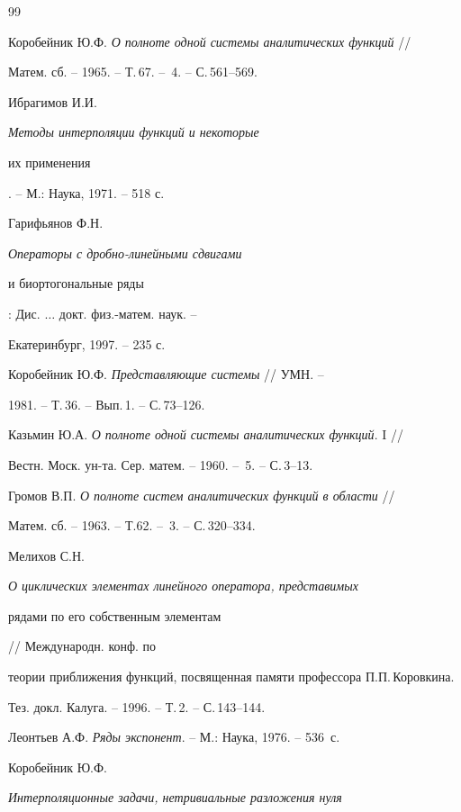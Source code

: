 \begin{thebibliography}{99}







Коробейник Ю.Ф. {\em О полноте одной системы аналитических функций} //


Матем. сб. -- 1965. -- Т.\,67. -- \No\,4. -- С.\,561--569.




Ибрагимов И.И. {\em Методы интерполяции функций и некоторые


их применения}. -- М.: Наука, 1971. -- 518 с.




Гарифьянов Ф.Н. {\em Операторы с дробно-линейными сдвигами


и биортогональные ряды}: Дис. $\dotsc$ докт. физ.-матем. наук. --


Екатеринбург, 1997. -- 235 с.




Коробейник Ю.Ф. {\em Представляющие системы} // УМН. -- 


1981. -- Т.\,36. -- Вып.\,1. -- С.\,73--126.




Казьмин Ю.А. {\em О полноте одной системы аналитических функций}. I //


Вестн. Моск. ун-та. Сер. матем. -- 1960. -- \No\,5. -- С.\,3--13.




Громов В.П. {\em О полноте систем аналитических функций в области} //


Матем. сб. -- 1963. -- Т.62. -- \No\,3. -- С.\,320--334.




Мелихов С.Н. {\em О циклических элементах линейного оператора, представимых


рядами по его собственным элементам} // Международн. конф. по


теории приближения функций, посвященная памяти профессора П.П.\,Коровкина.


Тез. докл. Калуга. -- 1996. -- Т.\,2. -- С.\,143--144.




Леонтьев А.Ф. {\em Ряды экспонент}. -- М.: Наука, 1976. -- 536~с.




Коробейник Ю.Ф. {\em Интерполяционные задачи, нетривиальные разложения нуля


}
\end{thebibliography}
